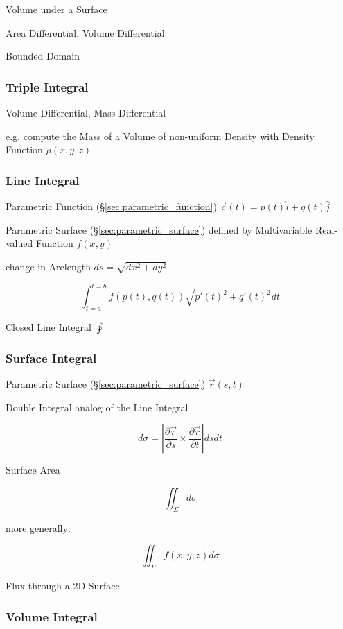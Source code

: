 Volume under a Surface

Area Differential, Volume Differential

Bounded Domain



\subsubsection{Triple Integral}\label{sec:triple_integral}

Volume Differential, Mass Differential

e.g. compute the Mass of a Volume of non-uniform Density with Density Function
$\rho(x,y,z)$



\subsubsection{Line Integral}\label{sec:line_integral}

Parametric Function (\S\ref{sec:parametric_function}) $\vec{c}(t) = p(t)\hat{i}
+ q(t)\hat{j}$

Parametric Surface (\S\ref{sec:parametric_surface}) defined by Multivariable
Real-valued Function $f(x,y)$

change in Arclength $ds = \sqrt{dx^2 + dy^2}$

\[
  \int_{t=a}^{t=b} f(p(t),q(t)) \sqrt{p'(t)^2 + q'(t)^2} dt
\]

Closed Line Integral $\oint$



\subsubsection{Surface Integral}\label{sec:surface_integral}

Parametric Surface (\S\ref{sec:parametric_surface})
$\vec{r}(s,t)$

Double Integral analog of the Line Integral

\[
  d\sigma =
    |\frac{\partial{\vec{r}}}{\partial{s}}
      \times \frac{\partial{\vec{r}}}{\partial{t}}| ds dt
\]

Surface Area

\[
  {\iint}_{\Sigma} d\sigma
\]

more generally:

\[
  {\iint}_{\Sigma} f(x,y,z) d\sigma
\]

Flux through a 2D Surface



\subsubsection{Volume Integral}\label{sec:volume_integral}

